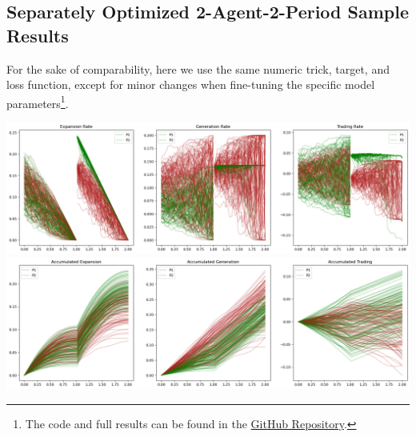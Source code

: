 \documentclass[a4paper,10pt]{article}
\newcommand{\1}{\mathbf{1}}
\begin{document}
\subsection{Separately Optimized 2-Agent-2-Period Sample Results}

For the sake of comparability, here we use the same numeric trick, target, and loss function, except for minor changes when fine-tuning the specific model parameters\footnote{The code and full results can be found in the \href{https://github.com/OrangeAoo/PA-MFG-FBSDE/blob/FBSDE/2Period/Separate_Optim_1Prdx2/Adamax_clamp_sig_MSE.ipynb}{GitHub Repository}.}.

\begin{center}
  \begin{minipage}[ht]{0.9\textwidth}
    \centering
    \includegraphics[]{FinalReports/Illustration_diagrams/Seprt-2A2P-Sigmoid-ResExamples/Rates.png}\\
    \includegraphics[]{FinalReports/Illustration_diagrams/Seprt-2A2P-Sigmoid-ResExamples/AccumRates.png}\\
    \label{fig:decomp-gen-sep}
  \end{minipage}
\end{center}
\vfill
\end{document}

